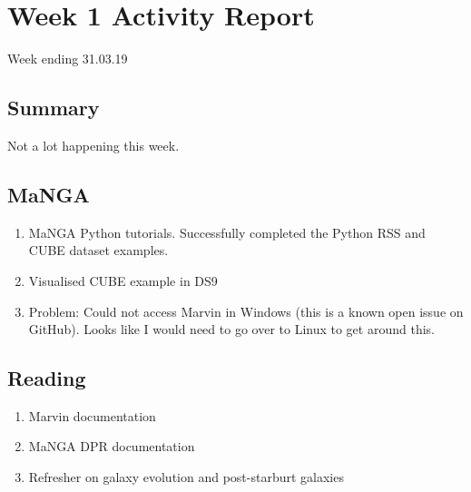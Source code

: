 \section{Week 1 Activity Report}
Week ending 31.03.19

\subsection{Summary}
Not a lot happening this week.

\subsection{MaNGA}
\begin{enumerate}
    \item MaNGA Python tutorials. Successfully completed the Python RSS and CUBE dataset examples.
    \item Visualised CUBE example in DS9
    \item Problem: Could not access Marvin in Windows (this is a known open issue on GitHub). Looks like I would need to go over to Linux to get around this.
\end{enumerate}

\subsection{Reading}
\begin{enumerate}
    \item Marvin documentation
    \item MaNGA DPR documentation
    \item Refresher on galaxy evolution and post-starburt galaxies \citep{sparke2007galaxies}
\end{enumerate}    
